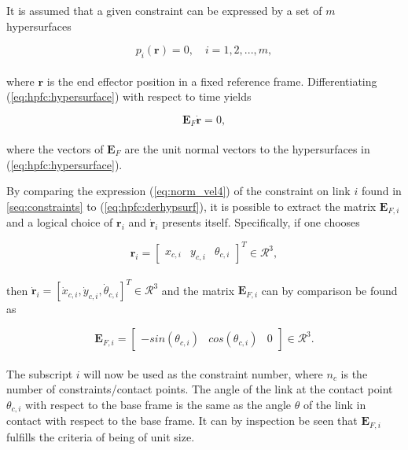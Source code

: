 It is assumed that a given constraint can be expressed by a set of $m$ hypersurfaces

\begin{equation}\label{eq:hpfc:hypersurface}
    p_i(\mathbf{r}) = 0, \quad i = 1, 2, ..., m,
\end{equation}
\\
where $\mathbf{r}$ is the end effector position in a fixed reference frame. Differentiating (\ref{eq:hpfc:hypersurface}) with respect to time yields

\begin{equation}\label{eq:hpfc:derhypsurf}
    \mathbf{E}_F \mathbf{\dot{r}} = 0,
\end{equation}
\\
where the vectors of $\mathbf{E}_F$ are the unit normal vectors to the hypersurfaces in (\ref{eq:hpfc:hypersurface}).

By comparing the expression (\ref{eq:norm_vel4}) of the constraint on link $i$ found in \ref{seq:constraints} to (\ref{eq:hpfc:derhypsurf}), it is possible to extract the matrix $\mathbf{E}_{F,i}$ and a logical choice of $\mathbf{r}_i$ and $\mathbf{\dot{r}}_i$ presents itself.
Specifically, if one chooses

\begin{equation}
    \mathbf{r}_i =
    \begin{bmatrix}
        x_{c,i} & y_{c,i} & \theta_{c,i}
    \end{bmatrix}^T \in \mathcal{R}^3,
\end{equation}
\\
then $\mathbf{\dot{r}}_i = [\dot{x}_{c,i}, \dot{y}_{c,i}, \dot{\theta}_{c,i}]^T \in \mathcal{R}^3$ and the matrix $\mathbf{E}_{F,i}$ can by comparison be found as

\begin{equation}
    \mathbf{E}_{F,i} =
    \begin{bmatrix}
        -sin(\theta_{c,i}) & cos(\theta_{c,i}) & 0
    \end{bmatrix} \in \mathcal{R}^3.
\end{equation}
\\
The subscript $i$ will now be used as the constraint number, where $n_c$ is the number of constraints/contact points.
The angle of the link at the contact point $\theta_{c,i}$ with respect to the base frame is the same as the angle $\theta$ of the link in contact with respect to the base frame. It can by inspection be seen that $\mathbf{E}_{F,i}$ fulfills the criteria of being of unit size.

